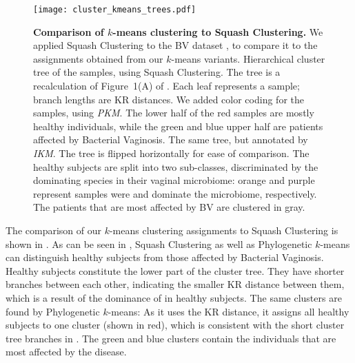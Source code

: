 \begin{figure}[p]
    \centering
    \texttt{[image: cluster\_kmeans\_trees.pdf]}
    \begin{subfigure}{0pt}
        \label{fig:cluster_kmeans_trees:sub:mass_tree}
    \end{subfigure}
    \begin{subfigure}{0pt}
        \label{fig:cluster_kmeans_trees:sub:imbalance_tree}
    \end{subfigure}
    \caption[Comparison of $k$-means clustering to Squash Clustering]{
        \textbf{Comparison of $k$-means clustering to Squash Clustering.}
        We applied Squash Clustering to the \ac{BV} dataset \cite{Srinivasan2012},
        to compare it to the assignments obtained from our $k$-means variants.
        Hierarchical cluster tree of the samples, using Squash Clustering.
        The tree is a recalculation of Figure~1(A) of .
        Each leaf represents a sample; branch lengths are KR distances.
        We added color coding for the samples, using \emph{PKM}.
        The lower half of the red samples are mostly healthy individuals,
        while the green and blue upper half are patients affected by Bacterial Vaginosis.
        The same tree, but annotated by \emph{IKM}.
        The tree is flipped horizontally for ease of comparison.
        The healthy subjects are split into two sub-classes,
        discriminated by the dominating species in their vaginal microbiome:
        orange and purple represent samples were  and 
        dominate the microbiome, respectively.
        The patients that are most affected by BV are clustered in gray.
    }
    \label{fig:cluster_kmeans_trees}
\end{figure}

The comparison of our $k$-means clustering assignments to Squash Clustering is shown in .
As can be seen in , Squash Clustering as well as
Phylogenetic $k$-means can distinguish healthy subjects from those affected by Bacterial Vaginosis.
Healthy subjects constitute the lower part of the cluster tree.
They have shorter branches between each other, indicating the smaller KR distance between them,
which is a result of the dominance of  in healthy subjects.
The same clusters are found by Phylogenetic $k$-means:
As it uses the KR distance, it assigns all healthy subjects to one cluster (shown in red),
which is consistent with the short cluster tree branches in .
The green and blue clusters contain the individuals that are most affected by the disease.

